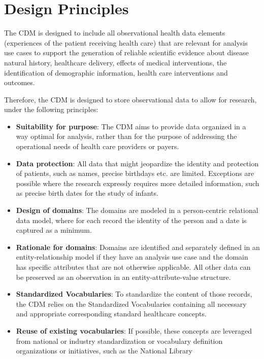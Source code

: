 \documentclass[11pt]{book}
\providecommand{\tightlist}{%
  \setlength{\itemsep}{0pt}\setlength{\parskip}{0pt}}
\begin{document}
\section{Design Principles}\label{design-principles}

The CDM is designed to include all observational health data elements
(experiences of the patient receiving health care) that are relevant for
analysis use cases to support the generation of reliable scientific
evidence about disease natural history, healthcare delivery, effects of
medical interventions, the identification of demographic information,
health care interventions and outcomes.

Therefore, the CDM is designed to store observational data to allow for
research, under the following principles:

\begin{itemize}
\tightlist
\item
  \textbf{Suitability for purpose}: The CDM aims to provide data
  organized in a way optimal for analysis, rather than for the purpose
  of addressing the operational needs of health care providers or
  payers.
\item
  \textbf{Data protection}: All data that might jeopardize the identity
  and protection of patients, such as names, precise birthdays etc. are
  limited. Exceptions are possible where the research expressly requires
  more detailed information, such as precise birth dates for the study
  of infants.
\item
  \textbf{Design of domains}: The domains are modeled in a
  person-centric relational data model, where for each record the
  identity of the person and a date is captured as a minimum.
\item
  \textbf{Rationale for domains}: Domains are identified and separately
  defined in an entity-relationship model if they have an analysis use
  case and the domain has specific attributes that are not otherwise
  applicable. All other data can be preserved as an observation in an
  entity-attribute-value structure.
\item
  \textbf{Standardized Vocabularies}: To standardize the content of
  those records, the CDM relies on the Standardized Vocabularies
  containing all necessary and appropriate corresponding standard
  healthcare concepts.
\item
  \textbf{Reuse of existing vocabularies}: If possible, these concepts
  are leveraged from national or industry standardization or vocabulary
  definition organizations or initiatives, such as the National Library

\end{itemize}
\end{document}
